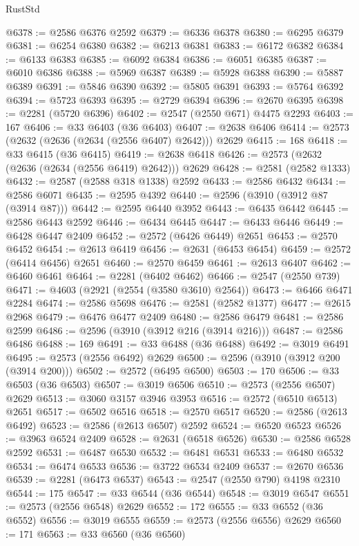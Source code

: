 \begin{lexlean}{RustStd}
\begin{coremodule}
@6378 := @2586 @6376 @2592
@6379 := @6336 @6378
@6380 := @6295 @6379
@6381 := @6254 @6380
@6382 := @6213 @6381
@6383 := @6172 @6382
@6384 := @6133 @6383
@6385 := @6092 @6384
@6386 := @6051 @6385
@6387 := @6010 @6386
@6388 := @5969 @6387
@6389 := @5928 @6388
@6390 := @5887 @6389
@6391 := @5846 @6390
@6392 := @5805 @6391
@6393 := @5764 @6392
@6394 := @5723 @6393
@6395 := @2729 @6394
@6396 := @2670 @6395
@6398 := @2281 (@5720 @6396)
@6402 := @2547 (@2550 @671) @4475 @2293
@6403 := 167
@6406 := @33 @6403 (@36 @6403)
@6407 := @2638 @6406
@6414 := @2573 (@2632 (@2636 (@2634 (@2556 @6407) @2642))) @2629
@6415 := 168
@6418 := @33 @6415 (@36 @6415)
@6419 := @2638 @6418
@6426 := @2573 (@2632 (@2636 (@2634 (@2556 @6419) @2642))) @2629
@6428 := @2581 (@2582 @1333)
@6432 := @2587 (@2588 @318 @1338) @2592
@6433 := @2586 @6432
@6434 := @2586 @6071
@6435 := @2595 @4392
@6440 := @2596 (@3910 (@3912 @87 (@3914 @87)))
@6442 := @2595 @6440 @3952
@6443 := @6435 @6442
@6445 := @2586 @6443 @2592
@6446 := @6434 @6445
@6447 := @6433 @6446
@6449 := @6428 @6447 @2409
@6452 := @2572 (@6426 @6449) @2651
@6453 := @2570 @6452
@6454 := @2613 @6419
@6456 := @2631 (@6453 @6454)
@6459 := @2572 (@6414 @6456) @2651
@6460 := @2570 @6459
@6461 := @2613 @6407
@6462 := @6460 @6461
@6464 := @2281 (@6402 @6462)
@6466 := @2547 (@2550 @739)
@6471 := @4603 (@2921 (@2554 (@3580 @3610) @2564))
@6473 := @6466 @6471 @2284
@6474 := @2586 @5698
@6476 := @2581 (@2582 @1377)
@6477 := @2615 @2968
@6479 := @6476 @6477 @2409
@6480 := @2586 @6479
@6481 := @2586 @2599
@6486 := @2596 (@3910 (@3912 @216 (@3914 @216)))
@6487 := @2586 @6486
@6488 := 169
@6491 := @33 @6488 (@36 @6488)
@6492 := @3019 @6491
@6495 := @2573 (@2556 @6492) @2629
@6500 := @2596 (@3910 (@3912 @200 (@3914 @200)))
@6502 := @2572 (@6495 @6500)
@6503 := 170
@6506 := @33 @6503 (@36 @6503)
@6507 := @3019 @6506
@6510 := @2573 (@2556 @6507) @2629
@6513 := @3060 @3157 @3946 @3953
@6516 := @2572 (@6510 @6513) @2651
@6517 := @6502 @6516
@6518 := @2570 @6517
@6520 := @2586 (@2613 @6492)
@6523 := @2586 (@2613 @6507) @2592
@6524 := @6520 @6523
@6526 := @3963 @6524 @2409
@6528 := @2631 (@6518 @6526)
@6530 := @2586 @6528 @2592
@6531 := @6487 @6530
@6532 := @6481 @6531
@6533 := @6480 @6532
@6534 := @6474 @6533
@6536 := @3722 @6534 @2409
@6537 := @2670 @6536
@6539 := @2281 (@6473 @6537)
@6543 := @2547 (@2550 @790) @4198 @2310
@6544 := 175
@6547 := @33 @6544 (@36 @6544)
@6548 := @3019 @6547
@6551 := @2573 (@2556 @6548) @2629
@6552 := 172
@6555 := @33 @6552 (@36 @6552)
@6556 := @3019 @6555
@6559 := @2573 (@2556 @6556) @2629
@6560 := 171
@6563 := @33 @6560 (@36 @6560)

\end{coremodule}
\end{lexlean}
